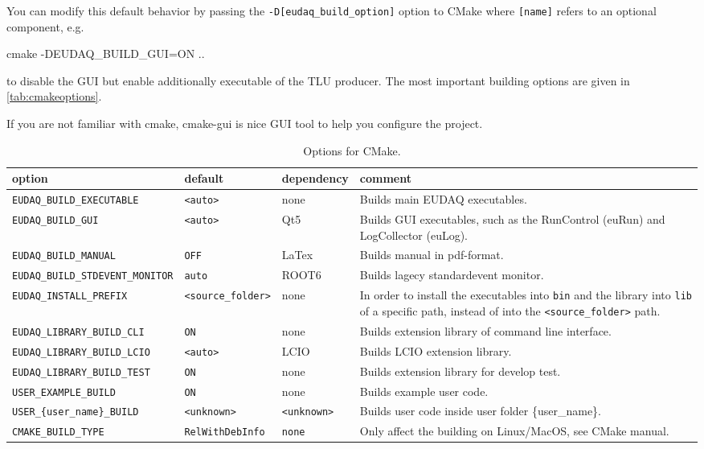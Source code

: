 You can modify this default behavior by passing the \texttt{-D[eudaq\_build\_option]} option to
CMake where \texttt{[name]} refers to an optional component, e.g.
\begin{listing}[mybash]
cmake -DEUDAQ_BUILD_GUI=ON  ..
\end{listing}
to disable the GUI but enable additionally executable of the TLU producer.
The most important building options are given in \autoref{tab:cmakeoptions}.

If you are not familiar with cmake, cmake-gui is nice GUI tool to help you configure the project.

\begin{table}[!h]
{\footnotesize
\begin{tabular}{l|l|p{2cm}|p{5.5cm}}
option &  default &  dependency & comment \\
\hline
\texttt{EUDAQ\_BUILD\_EXECUTABLE} &  \texttt{<auto>} & none & Builds main EUDAQ executables.\\
\texttt{EUDAQ\_BUILD\_GUI} & \texttt{<auto>} & Qt5 & Builds GUI executables, such as the RunControl (euRun) and LogCollector (euLog).\\
\texttt{EUDAQ\_BUILD\_MANUAL} & \texttt{OFF} & LaTex &  Builds manual in pdf-format.  \\
\texttt{EUDAQ\_BUILD\_STDEVENT\_MONITOR} & \texttt{auto} & ROOT6 &  Builds lagecy standardevent monitor.  \\
\texttt{EUDAQ\_INSTALL\_PREFIX} & \texttt{<source\_folder>} & none & In order to install the executables into \texttt{bin} and the library into \texttt{lib} of a specific path, instead of into the \texttt{<source\_folder>} path.\\
\texttt{EUDAQ\_LIBRARY\_BUILD\_CLI} & \texttt{ON} & none & Builds extension library of command line interface.\\
\texttt{EUDAQ\_LIBRARY\_BUILD\_LCIO} & \texttt{<auto>} & LCIO & Builds LCIO extension library.\\
\texttt{EUDAQ\_LIBRARY\_BUILD\_TEST} & \texttt{ON} & none & Builds extension library for develop test.\\
\texttt{USER\_EXAMPLE\_BUILD} & \texttt{ON} & none & Builds example user code.\\
\texttt{USER\_\{user\_name\}\_BUILD} & \texttt{<unknown>} & \texttt{<unknown>} & Builds user code inside user folder \{user\_name\}.\\
\texttt{CMAKE\_BUILD\_TYPE} & \texttt{RelWithDebInfo} & \texttt{none} & Only affect the building on Linux/MacOS, see CMake manual.\\
\end{tabular}
\caption{Options for CMake.}
\label{tab:cmakeoptions}
}
\end{table}


